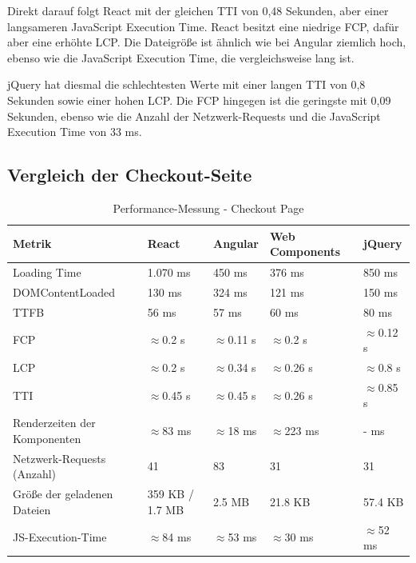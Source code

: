 \documentclass[oneside]{ausarbeitung}
\begin{document}
Direkt darauf folgt React mit der gleichen TTI von 0,48 Sekunden, aber einer langsameren JavaScript Execution Time. React besitzt eine niedrige FCP, dafür aber eine erhöhte LCP. Die Dateigröße ist ähnlich wie bei Angular ziemlich hoch, ebenso wie die JavaScript Execution Time, die vergleichsweise lang ist.

jQuery hat diesmal die schlechtesten Werte mit einer langen TTI von 0,8 Sekunden sowie einer hohen LCP. Die FCP hingegen ist die geringste mit 0,09 Sekunden, ebenso wie die Anzahl der Netzwerk-Requests und die JavaScript Execution Time von 33 ms.

\subsection{Vergleich der Checkout-Seite}

\begin{table}[H]
\centering
\caption{Performance-Messung - Checkout Page}
\begin{tabular}{|p{3.5cm}|p{2.5cm}|p{2.5cm}|p{2.5cm}|p{2.5cm}|}
\hline
\textbf{Metrik}                  & \textbf{React} & \textbf{Angular} & \textbf{Web Components} & \textbf{jQuery} \\ \hline
Loading Time                     & 1.070 ms      & 450 ms           & 376 ms                 & 850 ms          \\ \hline
DOMContentLoaded                 & 130 ms        & 324 ms           & 121 ms                 & 150 ms          \\ \hline
TTFB                             & 56 ms        & 57 ms            & 60 ms                  & 80 ms            \\ \hline
FCP                              & $\approx$0.2 s & $\approx$0.11 s & $\approx$0.2 s        & $\approx$0.12 s \\ \hline
LCP                              & $\approx$0.2 s & $\approx$0.34 s & $\approx$0.26 s       & $\approx$0.8 s \\ \hline
TTI                              & $\approx$0.45 s & $\approx$0.45 s & $\approx$0.26 s       & $\approx$0.85 s \\ \hline
Renderzeiten der Komponenten     & $\approx$83 ms         & $\approx$18 ms            & $\approx$223 ms                  & - ms           \\ \hline
Netzwerk-Requests (Anzahl)       & 41            & 83               & 31                    & 31              \\ \hline
Größe der geladenen Dateien      & 359 KB / 1.7 MB & 2.5 MB         & 21.8 KB               & 57.4 KB         \\ \hline
JS-Execution-Time                & $\approx$84 ms       & $\approx$53 ms          & $\approx$30 ms               & $\approx$52 ms         \\ \hline
\end{tabular}
\end{table}
\end{document}
